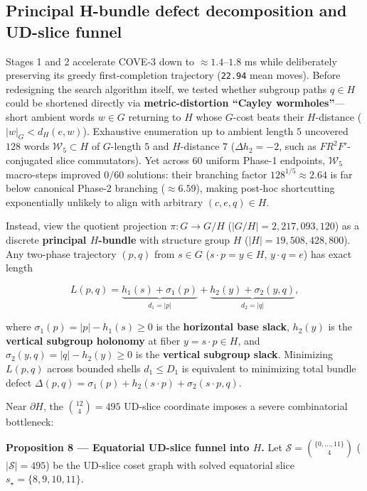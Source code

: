 \documentclass[10pt,twocolumn,letterpaper]{article}
\begin{document}
\hypertarget{principal-h-bundle-defect-decomposition-and-ud-slice-funnel}{%
\subsection{Principal H-bundle defect decomposition and UD-slice funnel}\label{principal-h-bundle-defect-decomposition-and-ud-slice-funnel}}

Stages 1 and 2 accelerate COVE-3 down to \(\approx 1.4\)--\(1.8\) ms
while deliberately preserving its greedy first-completion trajectory
(\texttt{22.94} mean moves). Before redesigning the search algorithm
itself, we tested whether subgroup paths \(q \in H\) could be shortened
directly via \textbf{metric-distortion ``Cayley wormholes''}---short
ambient words \(w \in G\) returning to \(H\) whose \(G\)-cost beats
their \(H\)-distance (\(|w|_G < d_H(e, w)\)). Exhaustive enumeration up
to ambient length \(5\) uncovered \(128\) words
\(\mathcal W_5 \subset H\) of \(G\)-length \(5\) and \(H\)-distance
\(7\) (\(\Delta h_2 = -2\), such as \(F R^2 F'\)-conjugated slice
commutators). Yet across \(60\) uniform Phase-1 endpoints,
\(\mathcal W_5\) macro-steps improved \textbf{\(0 / 60\)} solutions:
their branching factor \(128^{1/5} \approx 2.64\) is far below canonical
Phase-2 branching (\(\approx 6.59\)), making post-hoc shortcutting
exponentially unlikely to align with arbitrary \((c,e,q) \in H\).

Instead, view the quotient projection \(\pi: G \to G/H\)
(\(|G/H| = 2,217,093,120\)) as a discrete \textbf{principal
\(H\)-bundle} with structure group \(H\) (\(|H| = 19,508,428,800\)). Any
two-phase trajectory \((p, q)\) from \(s \in G\)
(\(s \cdot p = y \in H\), \(y \cdot q = e\)) has exact length

\[
L(p, q) = \underbrace{h_1(s) + \sigma_1(p)}_{d_1 = |p|} + \underbrace{h_2(y) + \sigma_2(y, q)}_{d_2 = |q|},
\tag{12}
\]

where \(\sigma_1(p) = |p| - h_1(s) \ge 0\) is the \textbf{horizontal
base slack}, \(h_2(y)\) is the \textbf{vertical subgroup holonomy} at
fiber \(y = s \cdot p \in H\), and
\(\sigma_2(y, q) = |q| - h_2(y) \ge 0\) is the \textbf{vertical subgroup
slack}. Minimizing \(L(p,q)\) across bounded shells \(d_1 \le D_1\) is
equivalent to minimizing total bundle defect
\(\Delta(p,q) = \sigma_1(p) + h_2(s \cdot p) + \sigma_2(s \cdot p, q)\).

Near \(\partial H\), the \(\binom{12}{4} = 495\) UD-slice coordinate
imposes a severe combinatorial bottleneck:

\textbf{Proposition 8 --- Equatorial UD-slice funnel into \(H\).} Let
\(\mathcal S = \binom{\{0,\dots,11\}}{4}\) (\(|\mathcal S| = 495\)) be
the UD-slice coset graph with solved equatorial slice
\(s_\star = \{8,9,10,11\}\).
\end{document}
